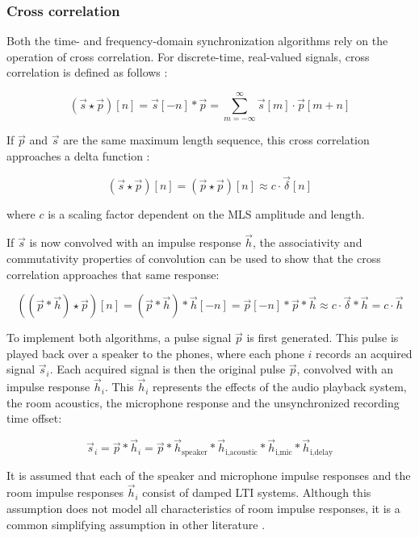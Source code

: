 \documentclass[a4paper, notitlepage]{report}
\begin{document}
\subsubsection{Cross correlation}
Both the time- and frequency-domain synchronization algorithms rely on the operation of cross correlation. For discrete-time, real-valued signals, cross correlation is defined as follows \cite[p.~228]{Girod2001}:

\begin{equation}
\label{eq:cross-correlation}
(\vec{s} \star \vec{p})[n] = \vec{s}[-n]*\vec{p} = \sum_{m=-\infty}^{\infty} \vec{s}[m] \cdot \vec{p}[m+n]
\end{equation}

If $\vec{p}$ and $\vec{s}$ are the same maximum length sequence, this cross correlation approaches a delta function \cite{MacWilliams1976}:

$$ (\vec{s} \star \vec{p})[n] = (\vec{p} \star \vec{p})[n] \approx c \cdot \vec{\delta}[n] $$

where $c$ is a scaling factor dependent on the MLS amplitude and length.

If $\vec{s}$ is now convolved with an impulse response $\vec{h}$, the associativity and commutativity properties of convolution \cite[p.~169]{Girod2001} can be used to show that the cross correlation approaches that same response:

$$ \left((\vec{p} * \vec{h}) \star \vec{p}\right)[n] = (\vec{p} * \vec{h}) * \vec{h}[-n] = \vec{p}[-n] * \vec{p} * \vec{h} \approx c \cdot \vec{\delta} * \vec{h} = c \cdot \vec{h} $$

To implement both algorithms, a pulse signal $\vec{p}$ is first generated. This pulse is played back over a speaker to the phones, where each phone $i$ records an acquired signal $\vec{s}_i$. Each acquired signal is then the original pulse $\vec{p}$, convolved with an impulse response $\vec{h}_i$. This $\vec{h}_i$ represents the effects of the audio playback system, the room acoustics, the microphone response and the unsynchronized recording time offset:

$$ \vec{s}_i = \vec{p} * \vec{h}_i = \vec{p} * \vec{h}_{\text{speaker}} * \vec{h}_{\text{i,acoustic}} * \vec{h}_{\text{i,mic}} * \vec{h}_{\text{i,delay}} $$

It is assumed that each of the speaker and microphone impulse responses and the room impulse responses $\vec{h}_i$ consist of damped LTI systems. Although this assumption does not model all characteristics of room impulse responses, it is a common simplifying assumption in other literature \cite{Stan2002249}.
\end{document}
